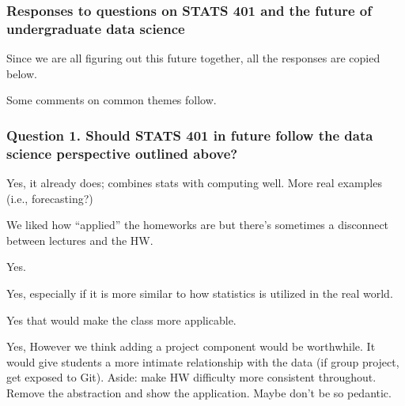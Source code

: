\documentclass{beamer}
\begin{document}
 

\begin{frame}

  \frametitle{Responses to questions on STATS 401 and the future of undergraduate data science}

  \begin{myitemize}
  \item Since we are all figuring out this future together, all the responses are copied below.
  \item Some comments on common themes follow.
    \end{myitemize}


\end{frame}

\begin{frame}
\frametitle{Question 1. Should STATS 401 in future follow the data science perspective outlined above?}

\begin{myitemize}
\item Yes, it already does; combines stats with computing well. More real examples (i.e., forecasting?)
\item We liked how ``applied'' the homeworks are but there's sometimes a disconnect between lectures and the HW.
\item Yes.
\item Yes, especially if it is more similar to how statistics is utilized in the real world.
\item Yes that would make the class more applicable.
\item Yes, However we think adding a project component would be worthwhile. It would give students a more intimate relationship with the data (if group project, get exposed to Git). Aside: make HW difficulty more consistent throughout. Remove the abstraction and show the application. Maybe don't be so pedantic.

\end{myitemize}
\end{frame}
\end{document}
